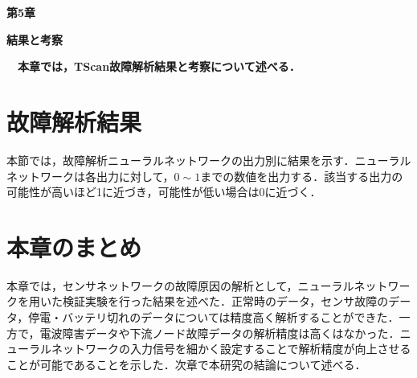 \newpage
\setcounter{chapter}{5}
\setcounter{section}{0}


\begin{center}
\vspace{0.5cm}
\huge{\bf 第5章}
\par
\vspace{1cm}
\hrulefill
\par
\vspace{1cm}
\huge{\bf 結果と考察}
\par
\vspace{0.5cm}
\hrulefill
\vspace{1cm}
\par

\begin{flushleft}
\large{{\bf　本章では，TScan故障解析結果と考察について述べる．}}
\end{flushleft}
\end{center}



\newpage
\section{故障解析結果}
本節では，故障解析ニューラルネットワークの出力別に結果を示す．ニューラルネットワークは各出力に対して，$0 \sim 1$までの数値を出力する．該当する出力の可能性が高いほど1に近づき，可能性が低い場合は0に近づく．

\newpage

\section{本章のまとめ}
本章では，センサネットワークの故障原因の解析として，ニューラルネットワークを用いた検証実験を行った結果を述べた．正常時のデータ，センサ故障のデータ，停電・バッテリ切れのデータについては精度高く解析することができた．一方で，電波障害データや下流ノード故障データの解析精度は高くはなかった．ニューラルネットワークの入力信号を細かく設定することで解析精度が向上させることが可能であることを示した．次章で本研究の結論について述べる．
\newpage
